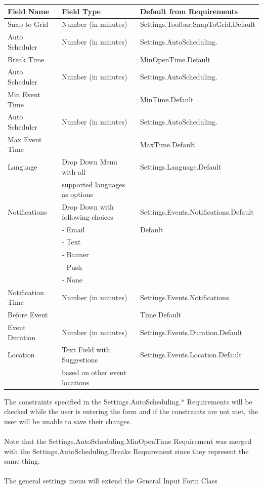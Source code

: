 \documentclass{scrreprt}
\begin{document}
\begin{center}
\begin{longtable}{ | p{3cm} | p{6cm} | p{6cm} | }
\hline
\textbf{Field Name} & \textbf{Field Type} & \textbf{Default from Requirements} \\
\hline
Snap to Grid & Number (in minutes) & Settings.Toolbar.SnapToGrid.Default \\
\hline
Auto Scheduler & Number (in minutes) & Settings.AutoScheduling. \\
Break Time & & MinOpenTime.Default\\
\hline
Auto Scheduler & Number (in minutes) & Settings.AutoScheduling. \\
Min Event Time & & MinTime.Default\\
\hline
Auto Scheduler & Number (in minutes) & Settings.AutoScheduling. \\
Max Event Time & & MaxTime.Default\\
\hline
Language & Drop Down Menu with all & Settings.Language.Default \\
& supported languages as options & \\
\hline
Notifications & Drop Down with following choices & Settings.Events.Notifications.Default \\
& - Email & Default\\
& - Text & \\
& - Banner & \\
& - Push & \\
& - None & \\
\hline
Notification Time & Number (in minutes) & Settings.Events.Notifications. \\
Before Event & & Time.Default \\
\hline
Event Duration & Number (in minutes) & Settings.Events.Duration.Default \\
\hline
Location & Text Field with Suggestions & Settings.Events.Location.Default \\
& based on other event locations & \\
\hline
\end{longtable}
\end{center}
The constraints specified in the Settings.AutoScheduling.* Requirements will be checked while the user is entering the form and if the constraints are not met, the user will be unable to save their changes.
\\\\
Note that the Settings.AutoScheduling.MinOpenTime Requirement was merged with the Settings.AutoScheduling.Breaks Requirement since they represent the same thing.
\\\\
The general settings menu will extend the General Input Form Class
\end{document}
